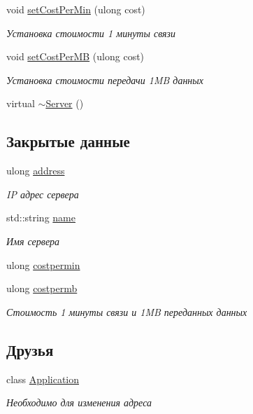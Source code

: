 \begin{DoxyCompactItemize}
void \hyperlink{class_network_service_1_1_server_a41772229229e7994706e6494f6366db8}{set\+Cost\+Per\+Min} (ulong cost)
\begin{DoxyCompactList}\small\item\em Установка стоимости 1 минуты связи \end{DoxyCompactList}\item 
void \hyperlink{class_network_service_1_1_server_a05c94527d60ec19810d7d37bd9c8aaa4}{set\+Cost\+Per\+M\+B} (ulong cost)
\begin{DoxyCompactList}\small\item\em Установка стоимости передачи 1\+M\+B данных \end{DoxyCompactList}\item 
virtual \hyperlink{class_network_service_1_1_server_a097877808f60d35a4f38bf199d5db208}{$\sim$\+Server} ()
\end{DoxyCompactItemize}
\subsection*{Закрытые данные}
\begin{DoxyCompactItemize}
\item 
ulong \hyperlink{class_network_service_1_1_server_a09382556ff4ab5abc7a79a333ad92329}{address}
\begin{DoxyCompactList}\small\item\em I\+P адрес сервера \end{DoxyCompactList}\item 
std\+::string \hyperlink{class_network_service_1_1_server_aaab7735b4b5809169ecb92fa66f0bca7}{name}
\begin{DoxyCompactList}\small\item\em Имя сервера \end{DoxyCompactList}\item 
ulong \hyperlink{class_network_service_1_1_server_a8b24807f5ca15d5348734cf5f4fe96ff}{costpermin}
\item 
ulong \hyperlink{class_network_service_1_1_server_a44f0b3aacbbbbbcf0216974c23d1baf1}{costpermb}
\begin{DoxyCompactList}\small\item\em Стоимость 1 минуты связи и 1\+M\+B переданных данных \end{DoxyCompactList}\end{DoxyCompactItemize}
\subsection*{Друзья}
\begin{DoxyCompactItemize}
\item 
class \hyperlink{class_network_service_1_1_server_a23f25bcc02a0e94c2f5a4188496b04d0}{Application}
\begin{DoxyCompactList}\small\item\em Необходимо для изменения адреса \end{DoxyCompactList}\end{DoxyCompactItemize}
